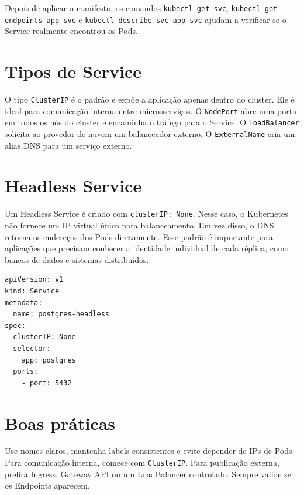 \documentclass[11pt,a4paper]{article}
\begin{document}
Depois de aplicar o manifesto, os comandos \texttt{kubectl get svc}, \texttt{kubectl get endpoints app-svc} e \texttt{kubectl describe svc app-svc} ajudam a verificar se o Service realmente encontrou os Pods.

\section*{\color{primary}Tipos de Service}

O tipo \texttt{ClusterIP} é o padrão e expõe a aplicação apenas dentro do cluster. Ele é ideal para comunicação interna entre microsserviços. O \texttt{NodePort} abre uma porta em todos os nós do cluster e encaminha o tráfego para o Service. O \texttt{LoadBalancer} solicita ao provedor de nuvem um balanceador externo. O \texttt{ExternalName} cria um alias DNS para um serviço externo.

\section*{\color{primary}Headless Service}

Um Headless Service é criado com \texttt{clusterIP: None}. Nesse caso, o Kubernetes não fornece um IP virtual único para balanceamento. Em vez disso, o DNS retorna os endereços dos Pods diretamente. Esse padrão é importante para aplicações que precisam conhecer a identidade individual de cada réplica, como bancos de dados e sistemas distribuídos.

\begin{lstlisting}[language=bash]
apiVersion: v1
kind: Service
metadata:
  name: postgres-headless
spec:
  clusterIP: None
  selector:
    app: postgres
  ports:
    - port: 5432
\end{lstlisting}

\section*{\color{primary}Boas práticas}

Use nomes claros, mantenha labels consistentes e evite depender de IPs de Pods. Para comunicação interna, comece com \texttt{ClusterIP}. Para publicação externa, prefira Ingress, Gateway API ou um LoadBalancer controlado. Sempre valide se os Endpoints aparecem.
\end{document}
